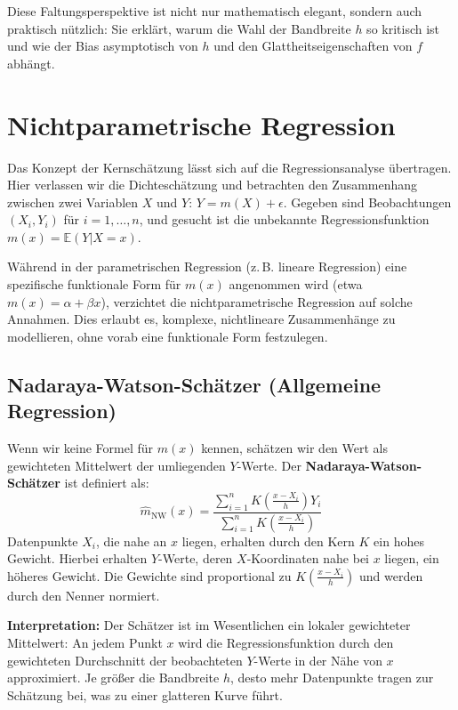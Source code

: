 \documentclass[a4paper, 11pt]{scrartcl}
\begin{document}
Diese Faltungsperspektive ist nicht nur mathematisch elegant, sondern auch praktisch nützlich: Sie erklärt, warum die Wahl der Bandbreite $h$ so kritisch ist und wie der Bias asymptotisch von $h$ und den Glattheitseigenschaften von $f$ abhängt.

\section{Nichtparametrische Regression}

Das Konzept der Kernschätzung lässt sich auf die Regressionsanalyse übertragen. Hier verlassen wir die Dichteschätzung und betrachten den Zusammenhang zwischen zwei Variablen $X$ und $Y$: $Y = m(X) + \epsilon$. Gegeben sind Beobachtungen $(X_i, Y_i)$ für $i = 1, \ldots, n$, und gesucht ist die unbekannte Regressionsfunktion $m(x) = \mathbb{E}(Y|X=x)$.

Während in der parametrischen Regression (z.\,B. lineare Regression) eine spezifische funktionale Form für $m(x)$ angenommen wird (etwa $m(x) = \alpha + \beta x$), verzichtet die nichtparametrische Regression auf solche Annahmen. Dies erlaubt es, komplexe, nichtlineare Zusammenhänge zu modellieren, ohne vorab eine funktionale Form festzulegen.

\subsection{Nadaraya-Watson-Schätzer (Allgemeine Regression)}

Wenn wir keine Formel für $m(x)$ kennen, schätzen wir den Wert als gewichteten Mittelwert der umliegenden $Y$-Werte. Der \textbf{Nadaraya-Watson-Schätzer} \cite{NadarayaWatson1964, Watson1964} ist definiert als:
\begin{equation}
	\hat{m}_{\text{NW}}(x) = \frac{\sum_{i=1}^n K\left(\frac{x - X_i}{h}\right) Y_i}{\sum_{i=1}^n K\left(\frac{x - X_i}{h}\right)}
\end{equation}
Datenpunkte $X_i$, die nahe an $x$ liegen, erhalten durch den Kern $K$ ein hohes Gewicht. Hierbei erhalten $Y$-Werte, deren $X$-Koordinaten nahe bei $x$ liegen, ein höheres Gewicht. Die Gewichte sind proportional zu $K\left(\frac{x - X_i}{h}\right)$ und werden durch den Nenner normiert.

\textbf{Interpretation:} Der Schätzer ist im Wesentlichen ein lokaler gewichteter Mittelwert: An jedem Punkt $x$ wird die Regressionsfunktion durch den gewichteten Durchschnitt der beobachteten $Y$-Werte in der Nähe von $x$ approximiert. Je größer die Bandbreite $h$, desto mehr Datenpunkte tragen zur Schätzung bei, was zu einer glatteren Kurve führt.
\end{document}
